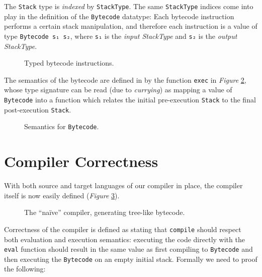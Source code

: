 \documentclass[a4paper]{article}
\newcommand{\fref}[1]{\emph{Figure} \ref{lst:#1}}
\begin{document}
        The \texttt{Stack} type is \emph{indexed} by \texttt{StackType}.
        The same \texttt{StackType} indices come into play in the definition of the \texttt{Bytecode} datatype:
        Each bytecode instruction performs a certain stack manipulation,
        and therefore each instruction is a value of type \texttt{Bytecode s₁ s₂},
        where \texttt{s₁} is the \emph{input StackType} and \texttt{s₂} is the \emph{output StackType}.

        \begin{figure}[h!]
            \caption{Typed bytecode instructions.
                \label{lst:bytecode}
            }
        \end{figure}

        The semantics of the bytecode are defined in by the function \texttt{exec} in \fref{exec}, whose type 
        signature can be read (due to \emph{currying}) as mapping a value of \texttt{Bytecode}
        into a function which relates the initial pre-execution \texttt{Stack} to the final post-execution \texttt{Stack}.

        \begin{figure}[h!]
            \caption{Semantics for \texttt{Bytecode}.
                \label{lst:exec}
            }
        \end{figure}

        
    \section{Compiler Correctness}
    \label{sec:correctness}
        With both source and target languages of our compiler in place, the compiler itself is now easily defined (\fref{compile}).

        \begin{figure}[h!]
            \caption{The ``naïve'' compiler, generating tree-like bytecode.
                \label{lst:compile}
            }
        \end{figure}

        Correctness of the compiler is defined as stating that \texttt{compile} should respect both evaluation and execution semantics: executing
        the code directly with the \texttt{eval} function should result in the same value as first compiling to \texttt{Bytecode} and
        then executing the \texttt{Bytecode} on an empty initial stack. Formally we need to proof the following:
        
\end{document}

